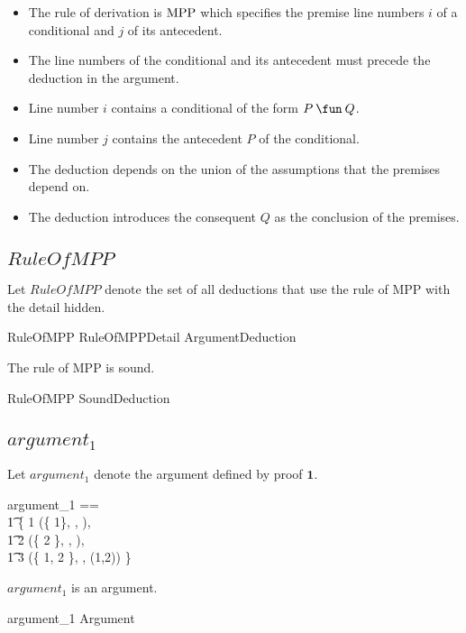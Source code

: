 \documentclass[11pt, oneside]{article}
\begin{document}
\begin{itemize}
	\item The rule of derivation is $\operatorname{MPP}$ which specifies the premise line numbers $i$ of a conditional and $j$ of its antecedent.
	\item The line numbers of the conditional and its antecedent must precede the deduction in the argument.
	\item Line number $i$ contains a conditional of the form $P \impliesProp Q$.
	\item Line number $j$ contains the antecedent $P$ of the conditional.
	\item The deduction depends on the union of the assumptions that the premises depend on.
	\item The deduction introduces the consequent $Q$ as the conclusion of the premises.
\end{itemize}

\subsection{$RuleOfMPP$}

Let $RuleOfMPP$ denote the set of all deductions that use the rule of MPP with the detail hidden.

\begin{zed}
	RuleOfMPP  RuleOfMPPDetail \project ArgumentDeduction
\end{zed}

The rule of MPP is sound.

\begin{zed}
	RuleOfMPP \subset SoundDeduction
\end{zed}

\subsection{$argument_1$}

Let $argument_1$ denote the argument defined by proof $\mathbf{1}$.

\begin{zed}
	argument_1 == \\
	\t1	\{ 1 \mapsto (\{ 1\}, \propP \impliesProp \propQ, ), \\
	\t1	2 \mapsto (\{ 2 \}, \propP, ), \\
	\t1	3 \mapsto (\{ 1, 2 \}, \propQ, (1,2)) \}
\end{zed}

\begin{example}
$argument_1$ is an argument.

\begin{zed}
	argument_1 \in Argument
\end{zed}

\end{example}
\end{document}
